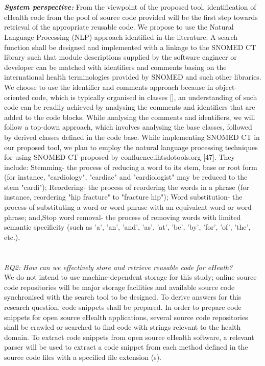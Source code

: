 \documentclass[a4paper]{article}
\begin{document}
 \\ \\
\textit{\textbf{System perspective:}} From the viewpoint of the proposed tool, identification of eHealth code from the pool of source code provided will be the first step towards retrieval of the appropriate reusable code. We propose to use the Natural Language Processing (NLP) approach identified in the literature. A  search function shall be designed and implemented with a linkage to the SNOMED CT library such that module descriptions supplied by the software engineer or developer can be matched with identifiers and comments basing on the international health terminologies provided by SNOMED and such other libraries. We choose to use the identifier and comments approach because in object-oriented code, which is typically organised in classes [], an understanding of such code can be readily achieved by analysing the comments and identifiers that are added to the code blocks. While analysing the comments and identifiers, we will follow a top-down approach, which involves analysing the base classes, followed by derived classes defined in the code base. While implementing SNOMED CT in our proposed tool, we plan to employ the natural language processing techniques for using SNOMED CT proposed by confluence.ihtsdotools.org [47]. They include: Stemming- the process of reducing a word to its stem, base or root form (for instance, "cardiology", "cardiac" and "cardiologist" may be reduced to the stem "cardi"); Reordering- the process of reordering the words in a phrase (for instance, reordering "hip fracture" to "fracture hip"); Word substitution- the process of substituting a word or word phrase with an equivalent word or word phrase; and,Stop word removal- the process of removing words with limited semantic specificity (such as 'a', 'an', 'and', 'as', 'at', 'be', 'by', 'for', 'of', 'the', etc.). \\ \\
\\\textit{RQ2: How can we effectively store and retrieve reusable code for eHeath?} \\
We do not intend to use machine-dependent storage for this study; online source code repositories will be major storage facilities and available source code synchronised with the search tool to be designed. To derive answers for this research question, code snippets shall be prepared. In order to prepare code snippets for open source eHealth applications, several source code repositories shall be crawled or searched to find code with strings relevant to the health domain. To extract code snippets from open source eHealth software, a relevant parser will be used to extract a code snippet from each method defined in the source code files with a specified file extension (s).\\ \\
\end{document}
